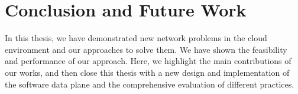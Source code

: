 \chapter{Conclusion and Future Work}
\label{thesis:chapter:conclusion}

In this thesis, we have demonstrated new network problems in the cloud environment
and our approaches to solve them. We have shown the feasibility and performance
of our approach. 
Here, we highlight the main contributions of our works, and then close this thesis with
a new design and implementation of the software data plane and the comprehensive evaluation of different practices.

